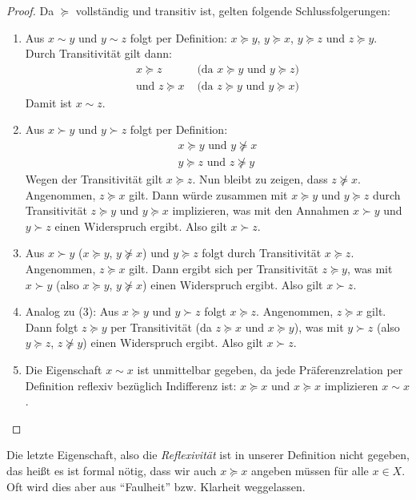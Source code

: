 \begin{proof}
	Da $\succeq$ vollständig und transitiv ist, gelten folgende Schlussfolgerungen:

	\begin{enumerate}
		\item
		      Aus $x \sim y$ und $y \sim z$ folgt per Definition: $x \succeq y$, $y \succeq x$, $y \succeq z$ und $z \succeq y$.
		      Durch Transitivität gilt dann:
		      \begin{align*}
			      x \succeq z             & \text{ (da } x \succeq y \text{ und } y \succeq z) \\
			      \text{und } z \succeq x & \text{ (da } z \succeq y \text{ und } y \succeq x)
		      \end{align*}
		      Damit ist $x \sim z$.

		\item
		      Aus $x \succ y$ und $y \succ z$ folgt per Definition:
		      \begin{align*}
			      x \succeq y \text{ und } y \nsucceq x \\
			      y \succeq z \text{ und } z \nsucceq y
		      \end{align*}
		      Wegen der Transitivität gilt $x \succeq z$.
		      Nun bleibt zu zeigen, dass $z \nsucceq x$.
		      Angenommen, $z \succeq x$ gilt. Dann würde zusammen mit $x \succeq y$ und $y \succeq z$ durch Transitivität $z \succeq y$ und $y \succeq x$ implizieren, was mit den Annahmen $x \succ y$ und $y \succ z$ einen Widerspruch ergibt.
		      Also gilt $x \succ z$.

		\item
		      Aus $x \succ y$ ($x \succeq y$, $y \nsucceq x$) und $y \succeq z$ folgt durch Transitivität $x \succeq z$.
		      Angenommen, $z \succeq x$ gilt. Dann ergibt sich per Transitivität $z \succeq y$, was mit $x \succ y$ (also $x \succeq y$, $y \nsucceq x$) einen Widerspruch ergibt.
		      Also gilt $x \succ z$.

		\item  Analog zu (3):
		      Aus $x \succeq y$ und $y \succ z$ folgt $x \succeq z$.
		      Angenommen, $z \succeq x$ gilt. Dann folgt $z \succeq y$ per Transitivität (da $z \succeq x$ und $x \succeq y$), was mit $y \succ z$ (also $y \succeq z$,  $z \nsucceq y$) einen Widerspruch ergibt.
		      Also gilt $x \succ z$.

		\item Die Eigenschaft $x \sim x$ ist unmittelbar gegeben, da jede Präferenzrelation per Definition reflexiv bezüglich Indifferenz ist: $x \succeq x$ und $x \succeq x$ implizieren $x \sim x$.
	\end{enumerate}

\end{proof}
\begin{remark}
	Die letzte Eigenschaft, also die \emph{Reflexivität} ist in unserer Definition nicht gegeben, das heißt es ist formal nötig, dass wir auch $x \succeq x$ angeben müssen für alle $x \in X$.
	Oft wird dies aber aus \enquote{Faulheit} bzw. Klarheit weggelassen.
\end{remark}

